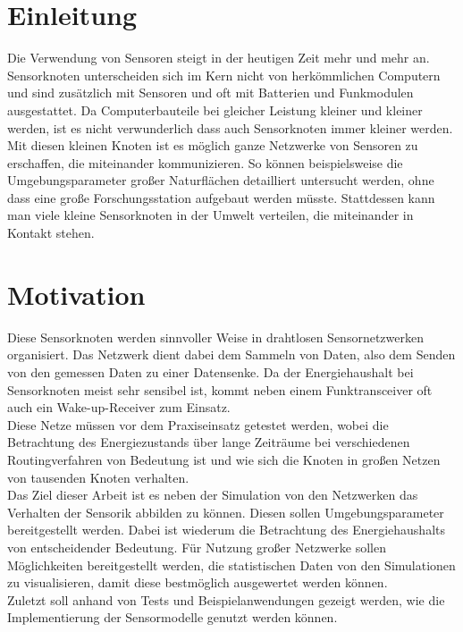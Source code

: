 \chapter{Einleitung}

Die Verwendung von Sensoren steigt in der heutigen Zeit mehr und mehr an. Sensorknoten unterscheiden sich im Kern nicht von herkömmlichen Computern und sind zusätzlich mit Sensoren und oft mit Batterien und Funkmodulen ausgestattet. Da Computerbauteile bei gleicher Leistung kleiner und kleiner werden, ist es nicht verwunderlich dass auch Sensorknoten immer kleiner werden. Mit diesen kleinen Knoten ist es möglich ganze Netzwerke von Sensoren zu erschaffen, die miteinander kommunizieren. So können beispielsweise die Umgebungsparameter großer Naturflächen detailliert untersucht werden, ohne dass eine große Forschungsstation aufgebaut werden müsste. Stattdessen kann man viele kleine Sensorknoten in der Umwelt verteilen, die miteinander in Kontakt stehen. \newline

\chapter{Motivation}

Diese Sensorknoten werden sinnvoller Weise in drahtlosen Sensornetzwerken organisiert. Das Netzwerk dient dabei dem Sammeln von Daten, also dem Senden von den gemessen Daten zu einer Datensenke. Da der Energiehaushalt bei Sensorknoten meist sehr sensibel ist, kommt neben einem Funktransceiver oft auch ein Wake-up-Receiver zum Einsatz.\\
Diese Netze müssen vor dem Praxiseinsatz getestet werden, wobei die Betrachtung des Energiezustands über lange Zeiträume bei verschiedenen Routingverfahren von Bedeutung ist und wie sich die Knoten in großen Netzen von tausenden Knoten verhalten.\\
Das Ziel dieser Arbeit ist es neben der Simulation von den Netzwerken das Verhalten der Sensorik abbilden zu können. Diesen sollen Umgebungsparameter bereitgestellt werden. Dabei ist wiederum die Betrachtung des Energiehaushalts von entscheidender Bedeutung. Für Nutzung großer Netzwerke sollen Möglichkeiten bereitgestellt werden, die statistischen Daten von den Simulationen zu visualisieren, damit diese bestmöglich ausgewertet werden können.\\
Zuletzt soll anhand von Tests und Beispielanwendungen gezeigt werden, wie die Implementierung der Sensormodelle genutzt werden können.